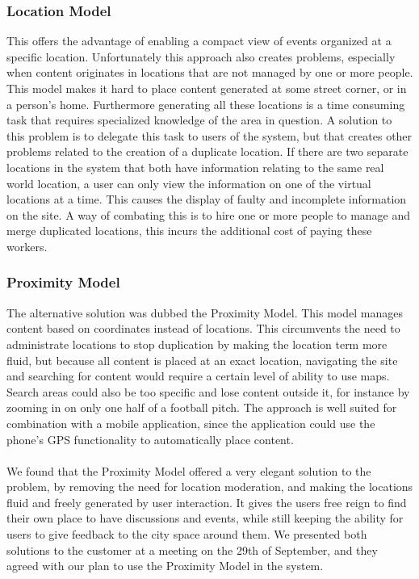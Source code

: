\subsubsection{Location Model}
This offers the advantage of enabling a compact view of events organized at a specific location. Unfortunately this approach also creates problems, especially when content originates in locations that are not managed by one or more people. This model makes it hard to place content generated at some street corner, or in a person's home. Furthermore generating all these locations is a time consuming task that requires specialized knowledge of the area in question. A solution to this problem is to delegate this task to users of the system, but that creates other problems related to the creation of a duplicate location. If there are two separate locations in the system that both have information relating to the same real world location, a user can only view the information on one of the virtual locations at a time. This causes the display of faulty and incomplete information on the site. A way of combating this is to hire one or more people to manage and merge duplicated locations, this incurs the additional cost of paying these workers.


\subsubsection{Proximity Model}
The alternative solution was dubbed the Proximity Model. This model manages content based on coordinates instead of locations. This circumvents the need to administrate locations to stop duplication by making the location term more fluid, but because all content is placed at an exact location, navigating the site and searching for content would require a certain level of ability to use maps. Search areas could also be too specific and lose content outside it, for instance by zooming in on only one half of a football pitch. The approach is well suited for combination with a mobile application, since the application could use the phone's GPS functionality to automatically place content.

\paragraph{} We found that the Proximity Model offered a very elegant solution to the problem, by removing the need for location moderation, and making the locations fluid and freely generated by user interaction. It gives the users free reign to find their own place to have discussions and events, while still keeping the ability for users to give feedback to the city space around them. We presented both solutions to the customer at a meeting on the 29th of September, and they agreed with our plan to use the Proximity Model in the system.

